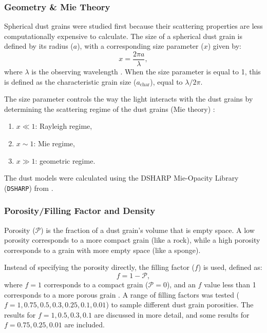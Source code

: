 \subsubsection{Geometry \& Mie Theory}

Spherical dust grains were studied first because their scattering properties are less computationally expensive to calculate. The size of a spherical dust grain is defined by its radius ($a$), with a corresponding size parameter ($x$) given by:
\begin{equation}
 x = \frac{2\pi a}{\lambda},
 \label{eq: size_parameter}
\end{equation}
\noindent where $\lambda$ is the observing wavelength \citep{Zhang2023}. When the size parameter is equal to 1, this is defined as the characteristic grain size ($a_{\text{char}}$), equal to $\lambda/2\pi$. 


The size parameter controls the way the light interacts with the dust grains by determining the scattering regime of the dust grains (Mie theory) \citep{Zhang2023}:
\begin{enumerate}
    \item $x \ll 1$: Rayleigh regime,
    \item $x \sim 1$: Mie regime,
    \item $x \gg 1$: geometric regime.
\end{enumerate}
\noindent The dust models were calculated using the DSHARP Mie-Opacity Library (\texttt{DSHARP}) from \cite{dsharp_code}. 








\subsubsection{Porosity/Filling Factor and Density}
Porosity ($\mathcal{P}$)  is the fraction of a dust grain's volume that is empty space. A low porosity corresponds to a more compact grain (like a rock), while a high porosity corresponds to a grain with more empty space (like a sponge).

Instead of specifying the porosity directly, the filling factor ($f$) is used, defined as:
\begin{equation}
 f = 1 - \mathcal{P},
    \label{eq: filling factor}
\end{equation}
\noindent where $f=1$ corresponds to a compact grain ($\mathcal{P} = 0$), and an $f$ value less than 1 corresponds to a more porous grain \citep{Zhang2023}. A range of filling factors was tested ($f = 1, 0.75, 0.5, 0.3, 0.25, 0.1, 0.01$) to sample different dust grain porosities. The results for $f = 1, 0.5, 0.3, 0.1$ are discussed in more detail, and some results for $f = 0.75, 0.25, 0.01$ are included.

